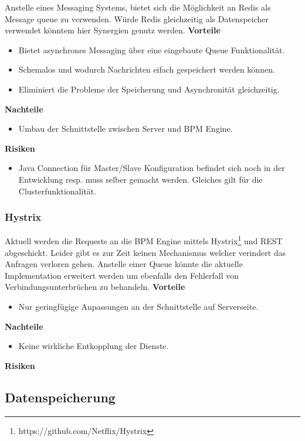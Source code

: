 Anstelle eines Messaging Systems, bietet sich die Möglichkeit an Redis als Message queue zu verwenden. Würde Redis gleichzeitig als Datenspeicher verwendet könntem hier Synergien genutz werden.
\newline
\newline
\textbf{Vorteile}
\begin{itemize}
	\item Bietet asynchrones Messaging über eine eingebaute Queue Funktionalität.
	\item Schemalos und wodurch Nachrichten eifach gespeichert werden können.
	\item Eliminiert die Probleme der Speicherung und Asynchronität gleichzeitig.
\end{itemize}
\textbf{Nachteile}
\begin{itemize}
	\item Umbau der Schnittstelle zwischen Server und BPM Engine.
\end{itemize}
\textbf{Risiken}
\begin{itemize}
	\item Java Connection für Master/Slave Konfiguration befindet sich noch in der Entwicklung resp. muss selber gemacht werden. Gleiches gilt für die Clusterfunktionalität.
\end{itemize}

\subsubsection{Hystrix}

Aktuell werden die Requests an die BPM Engine mittels Hystrix\footnote{https://github.com/Netflix/Hystrix} und REST abgeschickt. Leider gibt es zur Zeit keinen Mechanismus welcher verindert das Anfragen verloren gehen. Anstelle einer Queue könnte die aktuelle Implementation erweitert werden um ebenfalls den Fehlerfall von Verbindungsunterbrüchen zu behandeln.
\newline
\newline
\textbf{Vorteile}
\begin{itemize}
	\item Nur geringfügige Anpassungen an der Schnittstelle auf Serverseite.
\end{itemize}
\textbf{Nachteile}
\begin{itemize}
	\item Keine wirkliche Entkopplung der Dienste.
\end{itemize}
\textbf{Risiken}

\subsection{Datenspeicherung}

